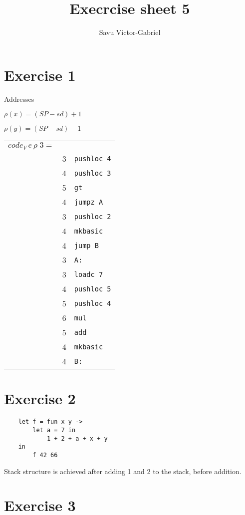\documentclass[10pt,a4paper]{article}
\title{Execrcise sheet 5}
\author{Savu Victor-Gabriel}
\begin{document}
	\maketitle
	
	\section{Exercise 1}
	
	Addresses
	
	$\rho(x) = (SP - sd) + 1$
	
	$\rho(y) = (SP - sd) - 1$
	
	\begin{tabular}{l l l}
		$code_V \, e \, \rho \; 3 = $ &  &\\
			& 3 & \texttt{pushloc 4} \\
			& 4 & \texttt{pushloc 3} \\
			& 5 & \texttt{gt} \\
			& 4 & \texttt{jumpz A} \\
			& 3 & \texttt{pushloc 2} \\
			& 4 & \texttt{mkbasic} \\
			& 4 & \texttt{jump B} \\
			& 3 & \texttt{A:} \\
			& 3 & \texttt{loadc 7} \\
			& 4 & \texttt{pushloc 5} \\
			& 5 & \texttt{pushloc 4} \\
			& 6 & \texttt{mul} \\
			& 5 & \texttt{add} \\
			& 4 & \texttt{mkbasic} \\
			& 4 & \texttt{B:} \\
	\end{tabular}
	
	\section{Exercise 2}
	
	\begin{lstlisting}
	let f = fun x y -> 
		let a = 7 in 
			1 + 2 + a + x + y
	in
		f 42 66
	\end{lstlisting}
	
	Stack structure is achieved after adding 1 and 2 to the stack, before addition.
	
	\section{Exercise 3}
	
\end{document}
